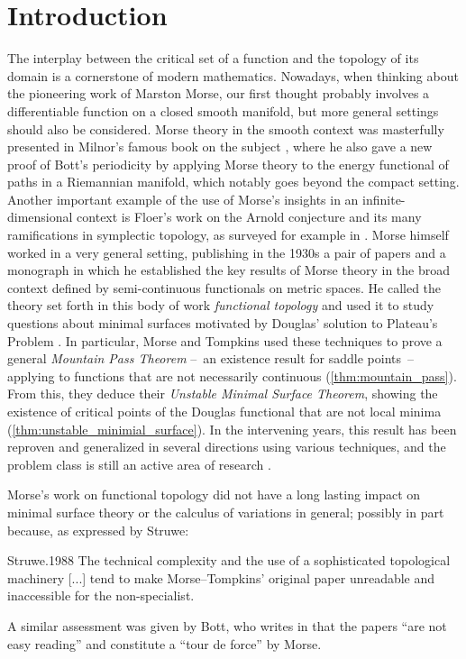 
\section{Introduction}

The interplay between the critical set of a function and the topology of its domain is a cornerstone of modern mathematics.
Nowadays, when thinking about the pioneering work of Marston Morse, our first thought probably involves a differentiable function on a closed smooth manifold, but more general settings should also be considered.
Morse theory in the smooth context was masterfully presented in Milnor's famous book on the subject \cite{Milnor.1963}, where he also gave a new proof of Bott's periodicity by applying Morse theory to the energy functional of paths in a Riemannian manifold, which notably goes beyond the compact setting.
Another important example of the use of Morse's insights in an infinite-dimensional context is Floer's work on the Arnold conjecture and its many ramifications in symplectic topology, as surveyed for example in \cite{Salamon.1999}.
Morse himself worked in a very general setting, publishing in the 1930s a pair of papers \cite{Morse.1937, Morse.1940} and a monograph \cite{Morse.1938} in which he established the key results of Morse theory in the broad context defined by semi-continuous functionals on metric spaces.
He called the theory set forth in this body of work \emph{functional topology} and used it to study questions about minimal surfaces motivated by Douglas' solution to Plateau’s Problem \cite{Douglas.1931}.
In particular, Morse and Tompkins \cite{Morse.1939} used these techniques to prove a general \emph{Mountain Pass Theorem} --~an existence result for saddle points~-- applying to functions that are not necessarily continuous (\cref{thm:mountain_pass}).
From this, they deduce their \emph{Unstable Minimal Surface Theorem}, showing the existence of critical points of the Douglas functional that are not local minima (\cref{thm:unstable_minimial_surface}).
In the intervening years, this result has been reproven and generalized in several directions using various techniques, and the problem class is still an active area of research \cite{Struwe.1984,Jost.1990,Jost.1991,Montezuma.2020,Marques.2021}.

Morse's work on functional topology did not have a long lasting impact on minimal surface theory or the calculus of variations in general; possibly in part because, as expressed by Struwe:
\begin{displaycquote}[p.~82]{Struwe.1988}
	The technical complexity and the use of a sophisticated topological machinery [...] tend to make Morse--Tompkins' original paper unreadable and inaccessible for the non-specialist.
\end{displaycquote}
A similar assessment was given by Bott, who writes in \cite[p.~934]{Bott.1980} that the papers \cite{Morse.1937, Morse.1940} ``are not easy reading'' and constitute a ``tour de force'' by Morse.

